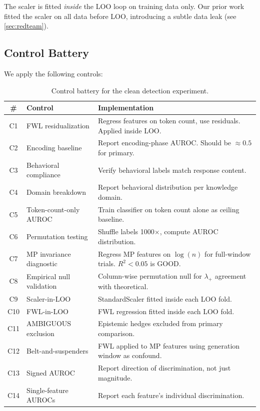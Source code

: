 The scaler is fitted \emph{inside} the LOO loop on training data only.
Our prior work fitted the scaler on all data before LOO, introducing
a subtle data leak (see \cref{sec:redteam}).

\subsection{Control Battery}

We apply the following controls:

\begin{table}[H]
\centering
\caption{Control battery for the clean detection experiment.}
\label{tab:controls}
\begin{tabularx}{\textwidth}{clX}
\toprule
\# & Control & Implementation \\
\midrule
C1 & FWL residualization & Regress features on token count, use residuals. Applied inside LOO. \\
C2 & Encoding baseline & Report encoding-phase AUROC. Should be $\approx 0.5$ for primary. \\
C3 & Behavioral compliance & Verify behavioral labels match response content. \\
C4 & Domain breakdown & Report behavioral distribution per knowledge domain. \\
C5 & Token-count-only AUROC & Train classifier on token count alone as ceiling baseline. \\
C6 & Permutation testing & Shuffle labels 1000$\times$, compute AUROC distribution. \\
C7 & MP invariance diagnostic & Regress MP features on $\log(n)$ for full-window trials. $R^2 < 0.05$ is GOOD. \\
C8 & Empirical null validation & Column-wise permutation null for $\lambda_+$ agreement with theoretical. \\
C9 & Scaler-in-LOO & StandardScaler fitted inside each LOO fold. \\
C10 & FWL-in-LOO & FWL regression fitted inside each LOO fold. \\
C11 & AMBIGUOUS exclusion & Epistemic hedges excluded from primary comparison. \\
C12 & Belt-and-suspenders & FWL applied to MP features using generation window as confound. \\
C13 & Signed AUROC & Report direction of discrimination, not just magnitude. \\
C14 & Single-feature AUROCs & Report each feature's individual discrimination. \\
\bottomrule
\end{tabularx}
\end{table}

